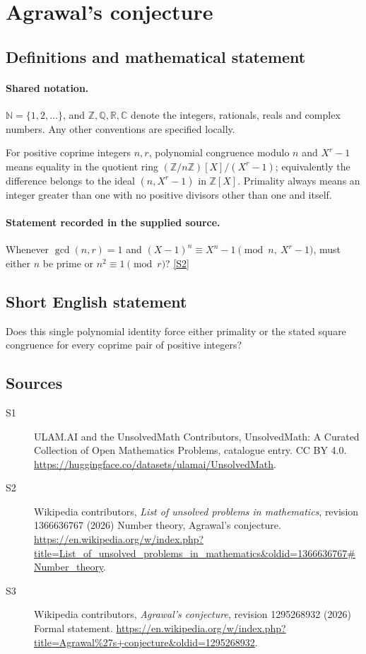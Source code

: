 \documentclass[11pt]{article}
\newcommand{\sref}[2]{\hyperlink{source:#1:#2}{[S#2]}}
\begin{document}
\section{Agrawal's conjecture}\label{statement}

\subsection{Definitions and mathematical statement}

\paragraph{Shared notation.}$\mathbb N=\{1,2,\ldots\}$, and $\mathbb Z,\mathbb Q,\mathbb R,\mathbb C$ denote the integers, rationals, reals and complex numbers. Any other conventions are specified locally.


For positive coprime integers $n,r$, polynomial congruence modulo $n$ and $X^r-1$ means equality in the quotient ring $(\mathbb Z/n\mathbb Z)[X]/(X^r-1)$; equivalently the difference belongs to the ideal $(n,X^r-1)$ in $\mathbb Z[X]$. Primality always means an integer greater than one with no positive divisors other than one and itself.
\paragraph{Statement recorded in the supplied source.}
Whenever $\gcd(n,r)=1$ and $(X-1)^n\equiv X^n-1\pmod{n,\ X^r-1}$, must either $n$ be prime or $n^2\equiv1\pmod r$? \sref{statement}{2}
\subsection{Short English statement}
Does this single polynomial identity force either primality or the stated square congruence for every coprime pair of positive integers?
\subsection{Sources}
\begin{description}
\item[\hypertarget{source:statement:1}{S1}] ULAM.AI and the UnsolvedMath Contributors, UnsolvedMath: A Curated Collection of Open Mathematics Problems, catalogue entry. CC BY 4.0. \url{https://huggingface.co/datasets/ulamai/UnsolvedMath}.
\item[\hypertarget{source:statement:2}{S2}] Wikipedia contributors, \emph{List of unsolved problems in mathematics}, revision 1366636767 (2026) Number theory, Agrawal's conjecture. \url{https://en.wikipedia.org/w/index.php?title=List_of_unsolved_problems_in_mathematics&oldid=1366636767#Number_theory}.
\item[\hypertarget{source:statement:3}{S3}] Wikipedia contributors, \emph{Agrawal's conjecture}, revision 1295268932 (2026) Formal statement. \url{https://en.wikipedia.org/w/index.php?title=Agrawal%27s+conjecture&oldid=1295268932}.
\end{description}
\label{end:statement}
\end{document}

